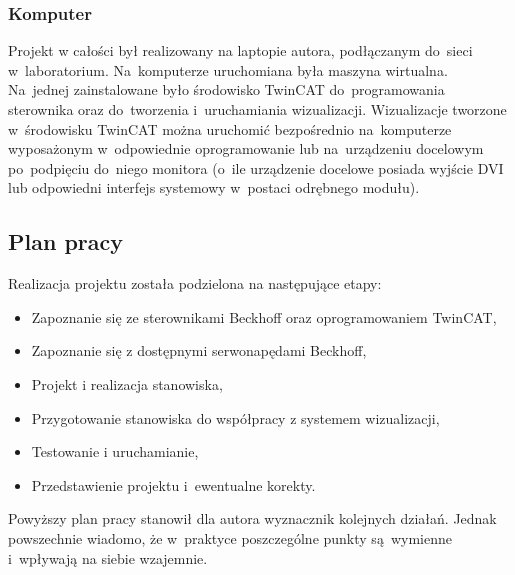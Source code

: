 \subsubsection{Komputer}
Projekt w całości był realizowany na laptopie autora, podłączanym do~sieci w~laboratorium. Na~komputerze uruchomiana była maszyna wirtualna. Na~jednej zainstalowane było środowisko TwinCAT do~programowania sterownika oraz do~tworzenia i~uruchamiania wizualizacji. Wizualizacje tworzone w~środowisku TwinCAT można uruchomić bezpośrednio na~komputerze wyposażonym w~odpowiednie oprogramowanie lub na~urządzeniu docelowym po~podpięciu do~niego monitora (o~ile urządzenie docelowe posiada wyjście DVI lub odpowiedni interfejs systemowy w~postaci odrębnego modułu).

\subsection{Plan pracy}
Realizacja projektu została podzielona na następujące etapy:
\begin{itemize}
\item Zapoznanie się ze sterownikami Beckhoff oraz oprogramowaniem TwinCAT,
\item Zapoznanie się z dostępnymi serwonapędami Beckhoff,
\item Projekt i realizacja stanowiska,
\item Przygotowanie stanowiska do współpracy z systemem wizualizacji,
\item Testowanie i uruchamianie,
\item Przedstawienie projektu i~ewentualne korekty.
\end{itemize}
\indent
\indent Powyższy plan pracy stanowił dla autora wyznacznik kolejnych działań. Jednak powszechnie wiadomo, że w~praktyce poszczególne punkty są~wymienne i~wpływają na siebie wzajemnie.